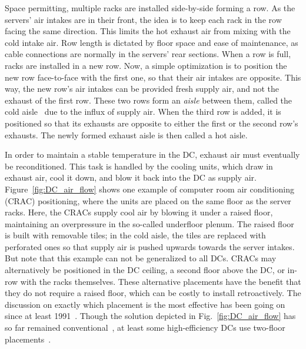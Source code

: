 \documentclass[officiallayout]{tktla}
\begin{document}
Space permitting, multiple racks are installed side-by-side forming a row. As
the servers' air intakes are in their front, the idea is to keep each rack in
the row facing the same direction. This limits the hot exhaust air from mixing
with the cold intake air. Row length is dictated by floor space and ease of
maintenance, as cable connections are normally in the servers' rear sections.
When a row is full, racks are installed in a new row. Now, a simple
optimization is to position the new row face-to-face with the first one, so
that their air intakes are opposite. This way, the new row's air intakes can
be provided fresh supply air, and not the exhaust of the first row. These two
rows form an \emph{aisle} between them, called the cold
aisle~\cite{Sullivan2000} due to the influx of supply air. When the third row
is added, it is positioned so that its exhausts are opposite to either the
first or the second row's exhausts. The newly formed exhaust aisle is then
called a hot aisle.

In order to maintain a stable temperature in the DC, exhaust air must
eventually be reconditioned. This task is handled by the cooling units, which
draw in exhaust air, cool it down, and blow it back into the DC as supply air.
Figure~\ref{fig:DC_air_flow} shows one example of computer room air
conditioning (CRAC) positioning, where the units are placed on the same floor
as the server racks. Here, the CRACs supply cool air by blowing it under a
raised floor, maintaining an overpressure in the so-called underfloor plenum.
The raised floor is built with removable tiles; in the cold aisle, the tiles
are replaced with perforated ones so that supply air is pushed upwards towards
the server intakes. But note that this example can not be generalized to all
DCs. CRACs may alternatively be positioned in the DC ceiling, a second floor
above the DC, or in-row with the racks themselves. These alternative
placements have the benefit that they do not require a raised floor, which can
be costly to install retroactively. The discussion on exactly which placement
is the most effective has been going on since at least 1991~\cite{Nakao1991}.
Though the solution depicted in Fig.~\ref{fig:DC_air_flow} has so far remained
conventional~\cite{Bailey2006,Niemann2010,Rasmussen2010}, at least some
high-efficiency DCs use two-floor placements~\cite{Hamilton2011,Miller2013}.
\end{document}

